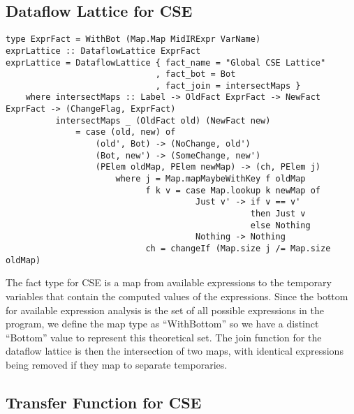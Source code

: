 \documentclass[11pt]{article}
\begin{document}
\subsection {Dataflow Lattice for CSE }

{\small\begin{verbatim}
type ExprFact = WithBot (Map.Map MidIRExpr VarName)
exprLattice :: DataflowLattice ExprFact 
exprLattice = DataflowLattice { fact_name = "Global CSE Lattice"
                              , fact_bot = Bot
                              , fact_join = intersectMaps }
    where intersectMaps :: Label -> OldFact ExprFact -> NewFact ExprFact -> (ChangeFlag, ExprFact)
          intersectMaps _ (OldFact old) (NewFact new) 
              = case (old, new) of 
                  (old', Bot) -> (NoChange, old') 
                  (Bot, new') -> (SomeChange, new') 
                  (PElem oldMap, PElem newMap) -> (ch, PElem j)
                      where j = Map.mapMaybeWithKey f oldMap
                            f k v = case Map.lookup k newMap of 
                                      Just v' -> if v == v' 
                                                 then Just v 
                                                 else Nothing
                                      Nothing -> Nothing 
                            ch = changeIf (Map.size j /= Map.size oldMap)
\end{verbatim}}

The fact type for CSE is a map from available expressions to the temporary variables that contain the computed values of the expressions. Since the bottom for available expression analysis is the set of all possible expressions in the program, we define the map type as ``WithBottom'' so we have a distinct ``Bottom'' value to represent this theoretical set. The join function for the dataflow lattice is then the intersection of two maps, with identical expressions being removed if they map to separate temporaries. 

\subsection {Transfer Function for CSE}
\end{document}
